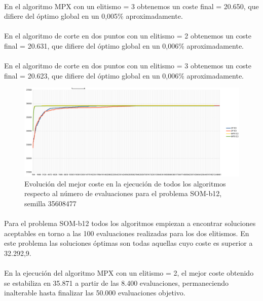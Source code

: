 	\paragraph{}En el algoritmo MPX con un elitismo = 3 obtenemos un coste final = 20.650, que difiere del óptimo global en un 0,005\% aproximadamente.
	
	\paragraph{}En el algoritmo de corte en dos puntos con un elitismo = 2 obtenemos un coste final = 20.631, que difiere del óptimo global en un 0,006\% aproximadamente.
	
	\paragraph{}En el algoritmo de corte en dos puntos con un elitismo = 3 obtenemos un coste final = 20.623, que difiere del óptimo global en un 0,006\% aproximadamente.

	\begin{figure}[H]
		\centering
		\includegraphics[scale=0.3]{img/35608477_SOM-b_12_n300_m90.png}
		\caption{Evolución del mejor coste en la ejecución de todos los algoritmos respecto al número de evaluaciones para el problema SOM-b12, semilla 35608477}
		\label{SOM-b_12_historico}
	\end{figure}

	\paragraph{}Para el problema SOM-b12 todos los algoritmos empiezan a encontrar soluciones aceptables en torno a las 100 evaluaciones realizadas para los dos elitismos. En este problema las soluciones óptimas son todas aquellas cuyo coste es superior a 32.292,9.
	
	\paragraph{}En la ejecución del algoritmo MPX con un elitismo = 2, el mejor coste obtenido se estabiliza en 35.871 a partir de las 8.400 evaluaciones, permaneciendo inalterable hasta finalizar las 50.000 evaluaciones objetivo.
	
